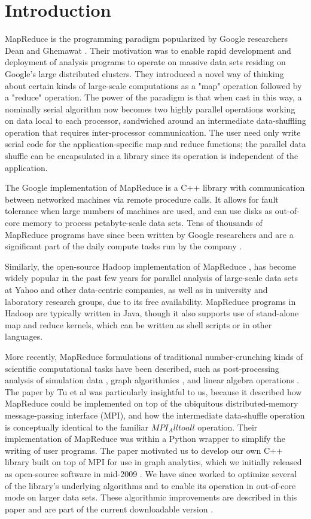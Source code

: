 \section{Introduction}
\label{sec:intro}

MapReduce is the programming paradigm popularized by Google
researchers Dean and Ghemawat \cite{Dean}.  Their motivation was to
enable rapid development and deployment of analysis programs to
operate on massive data sets residing on Google's large distributed
clusters.  They introduced a novel way of thinking about certain kinds
of large-scale computations as a "map" operation followed by a
"reduce" operation.  The power of the paradigm is that when cast in
this way, a nominally serial algorithm now becomes two highly parallel
operations working on data local to each processor, sandwiched around
an intermediate data-shuffling operation that requires inter-processor
communication.  The user need only write serial code for the
application-specific map and reduce functions; the parallel data
shuffle can be encapsulated in a library since its operation is
independent of the application.

The Google implementation of MapReduce is a C++ library with
communication between networked machines via remote procedure calls.
It allows for fault tolerance when large numbers of machines are used,
and can use disks as out-of-core memory to process petabyte-scale data
sets.  Tens of thousands of MapReduce programs have since been written
by Google researchers and are a significant part of the daily compute
tasks run by the company \cite{Dean2}.

Similarly, the open-source Hadoop implementation of MapReduce
\cite{Hadoop}, has become widely popular in the past few years for
parallel analysis of large-scale data sets at Yahoo and other
data-centric companies, as well as in university and laboratory
research groups, due to its free availability.  MapReduce programs in
Hadoop are typically written in Java, though it also supports use of
stand-alone map and reduce kernels, which can be written as shell
scripts or in other languages.

More recently, MapReduce formulations of traditional number-crunching
kinds of scientific computational tasks have been described, such as
post-processing analysis of simulation data \cite{Tu}, graph
algorithmics \cite{Cohen}, and linear algebra operations \cite{Fox}.
The paper by Tu et al \cite{Tu} was particularly insightful to us,
because it described how MapReduce could be implemented on top of the
ubiquitous distributed-memory message-passing interface (MPI), and how
the intermediate data-shuffle operation is conceptually identical to
the familiar $MPI_Alltoall$ operation.  Their implementation of
MapReduce was within a Python wrapper to simplify the writing of user
programs.  The paper motivated us to develop our own C++ library built
on top of MPI for use in graph analytics, which we initially released
as open-source software in mid-2009 \cite{MRMPI}.  We have since
worked to optimize several of the library's underlying algorithms and
to enable its operation in out-of-core mode on larger data sets.
These algorithmic improvements are described in this paper and are
part of the current downloadable version \cite{MRMPI}.

